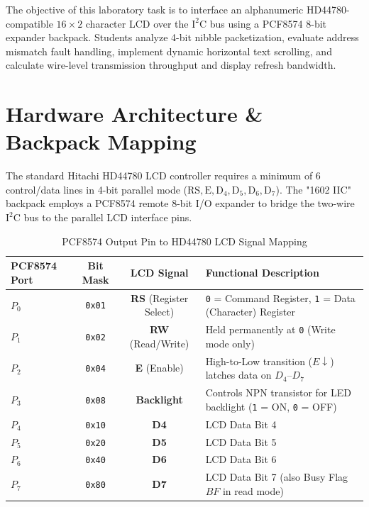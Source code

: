 \documentclass[11pt,a4paper]{article}
\begin{document}

\begin{objectivebox}
The objective of this laboratory task is to interface an alphanumeric HD44780-compatible $16\times 2$ character LCD over the $\text{I}^2\text{C}$ bus using a PCF8574 8-bit expander backpack. Students analyze 4-bit nibble packetization, evaluate address mismatch fault handling, implement dynamic horizontal text scrolling, and calculate wire-level transmission throughput and display refresh bandwidth.
\end{objectivebox}

\section{Hardware Architecture \& Backpack Mapping}
The standard Hitachi HD44780 LCD controller requires a minimum of 6 control/data lines in 4-bit parallel mode ($\text{RS}, \text{E}, \text{D}_4, \text{D}_5, \text{D}_6, \text{D}_7$). The "1602 IIC" backpack employs a PCF8574 remote 8-bit I/O expander to bridge the two-wire $\text{I}^2\text{C}$ bus to the parallel LCD interface pins.

\begin{table}[h!]
\centering
\small
\caption{PCF8574 Output Pin to HD44780 LCD Signal Mapping}
\vspace{4pt}
\begin{tabularx}{\textwidth}{l c c X}
\toprule
\textbf{PCF8574 Port} & \textbf{Bit Mask} & \textbf{LCD Signal} & \textbf{Functional Description} \\
\midrule
$P_0$ & \texttt{0x01} & \textbf{RS} (Register Select) & \texttt{0} = Command Register, \texttt{1} = Data (Character) Register \\
$P_1$ & \texttt{0x02} & \textbf{RW} (Read/Write) & Held permanently at \texttt{0} (Write mode only) \\
$P_2$ & \texttt{0x04} & \textbf{E} (Enable) & High-to-Low transition ($E \downarrow$) latches data on $D_4\text{--}D_7$ \\
$P_3$ & \texttt{0x08} & \textbf{Backlight} & Controls NPN transistor for LED backlight (\texttt{1} = ON, \texttt{0} = OFF) \\
$P_4$ & \texttt{0x10} & \textbf{D4} & LCD Data Bit 4 \\
$P_5$ & \texttt{0x20} & \textbf{D5} & LCD Data Bit 5 \\
$P_6$ & \texttt{0x40} & \textbf{D6} & LCD Data Bit 6 \\
$P_7$ & \texttt{0x80} & \textbf{D7} & LCD Data Bit 7 (also Busy Flag $BF$ in read mode) \\
\bottomrule
\end{tabularx}
\end{table}
\end{document}
